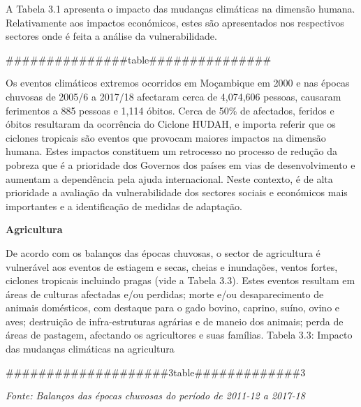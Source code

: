 \documentclass[
]{book}
\begin{document}
A Tabela 3.1 apresenta o impacto das mudanças climáticas na dimensão humana. Relativamente aos impactos económicos, estes são apresentados nos respectivos sectores onde é feita a análise da vulnerabilidade.

\#\#\#\#\#\#\#\#\#\#\#\#\#\#\#table\#\#\#\#\#\#\#\#\#\#\#\#\#\#\#

Os eventos climáticos extremos ocorridos em Moçambique em 2000 e nas épocas chuvosas de 2005/6 a 2017/18 afectaram cerca de 4,074,606 pessoas, causaram ferimentos a 885 pessoas e 1,114 óbitos. Cerca de 50\% de afectados, feridos e óbitos resultaram da ocorrência do Ciclone HUDAH, e importa referir que os ciclones tropicais são eventos que provocam maiores impactos na dimensão humana.
Estes impactos constituem um retrocesso no processo de redução da pobreza que é a prioridade dos Governos dos países em vias de desenvolvimento e aumentam a dependência pela ajuda internacional. Neste contexto, é de alta prioridade a avaliação da vulnerabilidade dos sectores sociais e económicos mais importantes e a identificação de medidas de adaptação.

\textbf{Agricultura}

De acordo com os balanços das épocas chuvosas, o sector de agricultura é vulnerável aos eventos de estiagem e secas, cheias e inundações, ventos fortes, ciclones tropicais incluindo pragas (vide a Tabela 3.3). Estes eventos resultam em áreas de culturas afectadas e/ou perdidas; morte e/ou desaparecimento de animais domésticos, com destaque para o gado bovino, caprino, suíno, ovino e aves; destruição de infra-estruturas agrárias e de maneio dos animais; perda de áreas de pastagem, afectando os agricultores e suas famílias.
Tabela 3.3: Impacto das mudanças climáticas na agricultura

\#\#\#\#\#\#\#\#\#\#\#\#\#\#\#\#\#\#\#\#3table\#\#\#\#\#\#\#\#\#\#\#\#\#3

\emph{Fonte: Balanços das épocas chuvosas do período de 2011-12 a 2017-18}
\end{document}
